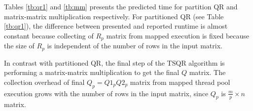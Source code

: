 \documentclass{article}
\begin{document}
Tables \ref{tb:qr1} and \ref{tb:mm} presents the predicted time for partition QR and matrix-matrix multiplication respectively. For partitioned QR (see Table \ref{tb:qr1}), the difference between presented and reported runtime is almost constant because collecting of $R_p$ matrix from mapped execution is fixed because the size of $R_p$ is independent of the number of rows in the input matrix. 

In contrast with partitioned QR, the final step of the TSQR algorithm is performing a matrix-matrix multiplication to get the final $Q$ matrix. The collection overhead of final $Q_p=Q1_pQ2_p$ matrix from mapped thread pool execution grows with the number of rows in the input matrix, since $Q_p$ is $\frac{m}{p} \times n$ matrix. 


\begin{table}[!tbhp]
    \begin{center}
    \end{center}
    \caption{Table presents the predicted QR1 runtime (see (\ref{eq:qr1_sm})) based on the empirically compute bandwidths and flops/s for matrix rows of $\frac{m}{p} \times n$, where $p$ denotes the number of GPUs used for the actual computation. The difference between the predicted and the reported runtime is almost a constant.\label{tb:qr1}}
\end{table}
\end{document}
